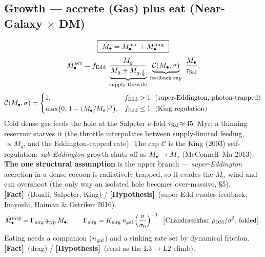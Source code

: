 \documentclass[11pt]{article}
\newcommand{\Fact}{\textbf{\textcolor{green!45!black}{[Fact]}}}
\newcommand{\Hyp}{\textbf{\textcolor{blue!55!black}{[Hypothesis]}}}
\newcommand{\Mbh}{M_{\bullet}}
\newcommand{\Msig}{M_\sigma}
\begin{document}
\subsection{Growth --- accrete (Gas) plus eat (Near-Galaxy $\times$ DM)}
\begin{equation}
\boxed{\ \dot\Mbh=\dot\Mbh^{\rm acc}+\dot\Mbh^{\rm mrg}\ }
\end{equation}
\begin{equation}
\dot\Mbh^{\rm acc}=f_{\rm Edd}\;\underbrace{\frac{M_g}{M_g+M_{g,\frac12}}}_{\text{supply throttle}}\;\underbrace{\mathcal{C}(\Mbh,\sigma)}_{\text{feedback cap}}\;\frac{\Mbh}{\tau_{\rm Sal}}.
\label{eq:acc}
\end{equation}
\begin{equation}
\mathcal{C}(\Mbh,\sigma)=\begin{cases}1, & f_{\rm Edd}>1\ \ (\text{super-Eddington, photon-trapped})\\[2pt] \max\!\big(0,\,1-(\Mbh/\Msig)^{\beta}\big), & f_{\rm Edd}\le1\ \ (\text{King regulation})\end{cases}
\end{equation}
Cold dense gas feeds the hole at the Salpeter $e$-fold $\tau_{\rm Sal}\!\approx\!45$~Myr; a thinning reservoir starves it (the throttle interpolates between supply-limited feeding, $\propto M_g$, and the Eddington-capped rate). The cap $\mathcal C$ is the King (2003) self-regulation: \emph{sub-Eddington} growth shuts off as $\Mbh\!\to\!\Msig$ (McConnell--Ma 2013). \textbf{The one structural assumption} is the upper branch --- \emph{super-Eddington} accretion in a dense cocoon is radiatively trapped, so it evades the $\Msig$ wind and can overshoot (the only way an isolated hole becomes over-massive, \S5). \Fact\ (Bondi, Salpeter, King) / \Hyp\ (super-Edd evades feedback; Inayoshi, Haiman \& Ostriker 2016).
\begin{equation}
\dot\Mbh^{\rm mrg}=\Gamma_{\rm mrg}\,q_{\rm typ}\,\Mbh,\qquad
\Gamma_{\rm mrg}=K_{\rm mrg}\,n_{\rm gal}\,\Big(\frac{\sigma}{\sigma_0}\Big)^{-1}\ \ \big[\text{Chandrasekhar }\rho_{\rm DM}/\sigma^3\text{, folded}\big].
\label{eq:mrg}
\end{equation}
Eating needs a companion ($n_{\rm gal}$) and a sinking rate set by dynamical friction. \Fact\ (drag) / \Hyp\ (read as the L3$\to$L2 climb).
\end{document}
